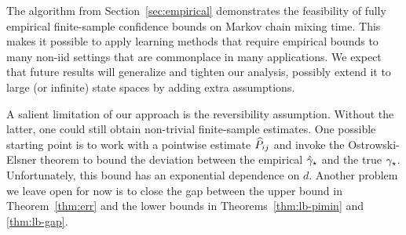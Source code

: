 

The algorithm from Section~\ref{sec:empirical} demonstrates the
feasibility of fully empirical finite-sample confidence bounds on
Markov chain mixing time.
This makes it possible to apply learning methods that require
empirical bounds to many non-iid settings that are commonplace in many
applications.
We expect that future results will generalize and tighten our
analysis, possibly extend it to large (or infinite) state spaces by
adding extra assumptions.

A salient limitation of our approach is the reversibility assumption.
Without the latter, one could still obtain non-trivial finite-sample
estimates.
One possible starting point is to work with a pointwise estimate $\widehat
P_{ij}$ and invoke the Ostrowski-Elsner theorem
\citep{stewart1990matrix} to bound the deviation between the empirical
$\hat\gamma_{\star}$ and the true $\gamma_{\star}$.
Unfortunately, this bound has an exponential dependence on $d$.
Another problem we leave open for now is to close the gap between the
upper bound in Theorem~\ref{thm:err} and the lower bounds in
Theorems~\ref{thm:lb-pimin} and \ref{thm:lb-gap}. 

